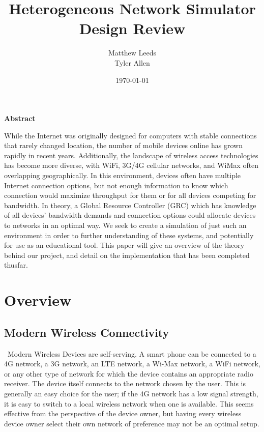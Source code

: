 \documentclass[11pt]{article}
\title{Heterogeneous Network Simulator Design Review}
\author{Matthew Leeds\\
	Tyler Allen\\}
\date{\today}
\begin{document}
\maketitle

{\setlength{\parindent}{0cm} \large \textbf{Abstract}}

While the Internet was originally designed for computers with stable connections that 
rarely changed location, the number of mobile devices online has grown rapidly in recent 
years. Additionally, the landscape of wireless access technologies has become more 
diverse, with WiFi, 3G/4G cellular networks, and WiMax often overlapping geographically. 
In this environment, devices often have multiple Internet connection options, but not 
enough information to know which connection would maximize throughput for them or for all 
devices competing for bandwidth. In theory, a Global Resource Controller (GRC) which has 
knowledge of all devices' bandwidth demands and connection options could allocate devices 
to networks in an optimal way. We seek to create a simulation of just such an environment 
in order to further understanding of these systems, and potentially for use as an 
educational tool. This paper will give an overview of the theory behind our project, and 
detail on the implementation that has been completed thusfar.

\section{Overview}
\subsection{Modern Wireless Connectivity}
~\indent Modern Wireless Devices are self-serving. A smart phone can be connected to a
4G network, a 3G network, an LTE network, a Wi-Max network, a WiFi network, 
or any other type of network for which the device contains an appropriate 
radio receiver. The device itself connects to the network chosen by the user. 
This is generally an easy choice for the user; if the 4G network has a 
low signal strength, it is easy to switch to a local wireless network when one 
is available. This seems effective from the perspective of the device owner, 
but having every wireless device owner select their own network of preference 
may not be an optimal setup.
\end{document}
